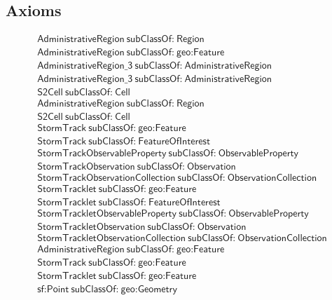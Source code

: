 \subsection{Axioms}
\begin{align}
  \textsf{AdministrativeRegion}~\textsf{subClassOf:}~\textsf{Region}\\
  \textsf{AdministrativeRegion}~\textsf{subClassOf:}~\textsf{geo:Feature}\\
  \textsf{AdministrativeRegion\_3}~\textsf{subClassOf:}~\textsf{AdministrativeRegion}\\
  \textsf{AdministrativeRegion\_3}~\textsf{subClassOf:}~\textsf{AdministrativeRegion}\\
  \textsf{S2Cell}~\textsf{subClassOf:}~\textsf{Cell}\\
  \textsf{AdministrativeRegion}~\textsf{subClassOf:}~\textsf{Region}\\
  \textsf{S2Cell}~\textsf{subClassOf:}~\textsf{Cell}\\
  \textsf{StormTrack}~\textsf{subClassOf:}~\textsf{geo:Feature}\\
  \textsf{StormTrack}~\textsf{subClassOf:}~\textsf{FeatureOfInterest}\\
  \textsf{StormTrackObservableProperty}~\textsf{subClassOf:}~\textsf{ObservableProperty}\\
  \textsf{StormTrackObservation}~\textsf{subClassOf:}~\textsf{Observation}\\
  \textsf{StormTrackObservationCollection}~\textsf{subClassOf:}~\textsf{ObservationCollection}\\
  \textsf{StormTracklet}~\textsf{subClassOf:}~\textsf{geo:Feature}\\
  \textsf{StormTracklet}~\textsf{subClassOf:}~\textsf{FeatureOfInterest}\\
  \textsf{StormTrackletObservableProperty}~\textsf{subClassOf:}~\textsf{ObservableProperty}\\
  \textsf{StormTrackletObservation}~\textsf{subClassOf:}~\textsf{Observation}\\
  \textsf{StormTrackletObservationCollection}~\textsf{subClassOf:}~\textsf{ObservationCollection}\\
  \textsf{AdministrativeRegion}~\textsf{subClassOf:}~\textsf{geo:Feature}\\
  \textsf{StormTrack}~\textsf{subClassOf:}~\textsf{geo:Feature}\\
  \textsf{StormTracklet}~\textsf{subClassOf:}~\textsf{geo:Feature}\\
  \textsf{sf:Point}~\textsf{subClassOf:}~\textsf{geo:Geometry}\\

\end{align}
